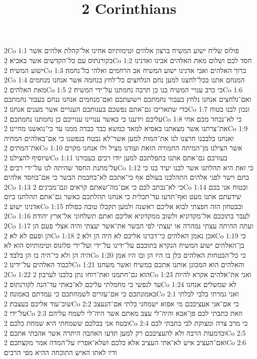 

\title{2 Corinthians}

2Co 1:1  פולוס שליח ישוע המשיח ברצון אלהים וטימותיוס אחינו אל־קהלת אלהים אשר בקורנתוס עם כל־הקדשים אשר באכיא׃
2Co 1:2  חסד לכם ושלום מאת האלהים אבינו ואדנינו ישוע המשיח׃
2Co 1:3  ברוך האלהים ואבי אדנינו ישוע המשיח אב הרחמים ואלהי כל־נחמה׃
2Co 1:4  המנחם אתנו בכל־לחצנו למען נחם הנלחצים כל־לחץ בנחמה אשר אנחנו מנחמים מאת האלהים׃
2Co 1:5  כי כרב ענויי המשיח בנו כן תרבה נחמתנו על־ידי המשיח׃
2Co 1:6  ואם־נלחצים אנחנו נלחץ בעבור נחמתכם וישועתכם ואם־מנחמים אנחנו ננחם בעבור נחמתכם כדי שתאריכו גם־אתם נפשכם בענותכם הענויים אשר מענים אנחנו׃
2Co 1:7  ונכון לבנו בטוח עליכם וידענו כי כאשר ענויינו ענוייכם כן נחמתנו נחמתכם׃
2Co 1:8  כי לא־נכחד מכם אחי את־צרתנו אשר מצאתנו באסיא למאד כמשא כבד כבדה ממנו עד כי־נואשנו מחיינו׃
2Co 1:9  ואנחנו בלבבנו חרצנו לנו את־המות למען אשר־לא נבטח בנפשנו כי אם־באלהים המחיה את־המתים׃
2Co 1:10  אשר הצילנו מן־המיתה החמורה הזאת ועודנו מציל ולו אנחנו מקוים שיוסיף להצילנו׃
2Co 1:11  בעזרכם גם־אתם אתנו בתפלתכם למען יודו רבים בעבורנו על־מתנת החסד שהיתה לנו על־ידי רבים׃
2Co 1:12  כי זאת היא תהלתנו אשר לבנו יעיד בנו כי בתם וישר לפני אלהים התהלכנו בעולם אף כי־אתכם לא־בחכמת הבשר כי אם־בחסד אלהים׃
2Co 1:13  כי לא־נכתב לכם כי אם־מה־שאתם קראים וגם־מבינים׃
2Co 1:14  ובטוח אני בכם שידעתם אתנו מעט ואף־תדעו עד־תכלית כי אנחנו תהלתכם כאשר גם־אתם תהלתנו ביום אדנינו ישוע׃
2Co 1:15  ובבטחון הזה חפצתי לבוא אליכם ראשנה ולמען תקבלו טובה כפולה׃
2Co 1:16  לעבר בתוככם אל־מקדוניא ולשוב ממקדוניא אליכם ואתם תשלחוני אל־ארץ יהודה׃
2Co 1:17  ועתה ההיתה עצתי נמהרה או יעצתי לפי הבשר את־אשר יעצתי והיה אצלי פעם הן הן ופעם לא לא׃
2Co 1:18  אכן נאמן האלהים כי־דברנו אליכם לא היה הן ולא׃
2Co 1:19  כי בן־האלהים ישוע המשיח הנקרא בתוככם על־ידינו על־ידי ועל־ידי סלונוס וטימותיוס הוא לא היה הן ולא כי־היה בו הן בלבד׃
2Co 1:20  כי כל־הבטחות האלהים כלן בו היו הן ובו היו אמן לכבוד האלהים על־ידינו׃
2Co 1:21  והאלהים הוא המכונן אותנו אתכם במשיח ואשר משחנו׃
2Co 1:22  הוא גם־חתמנו ואת־רוחו נתן בלבנו לערבון׃
2Co 1:23  ואני את־אלהים אקרא להיות עד לנפשי כי מחמלתי עליכם לא־באתי עד־הנה לקורנתוס׃
2Co 1:24  לא שמשלים אנחנו באמונתכם כי אם־עזרים לשמחתכם כי עמדתם באמונה׃
2Co 2:1  ואני גמרתי בלבי לבלתי שוב־עוד אליכם בעצבת׃
2Co 2:2  כי אם־אני אעציבכם מי אפוא ישמחני בלתי אם־הנעצב על־ידי׃
2Co 2:3  וזאת כתבתי לכם פן־אבא והיה־לי עצב מאתם אשר היה־לי לשמח עליהם ובטח אני בכלכם ששמחתי היא שמחת כלכם׃
2Co 2:4  כי מרב צרה ומצוקת לבי כתבתי לכם ובדמעות הרבה ולא להעציבכם רק למען תדעו האהבה היתרה אשר אהבתי אתכם׃
2Co 2:5  ואם־העציב איש לא־אתי העציב אלא כלכם ושלא־אפריז על־המדה אמר מקצתכם׃
2Co 2:6  ודיו לאתו האיש התוכחה ההיא מפי הרבים׃
